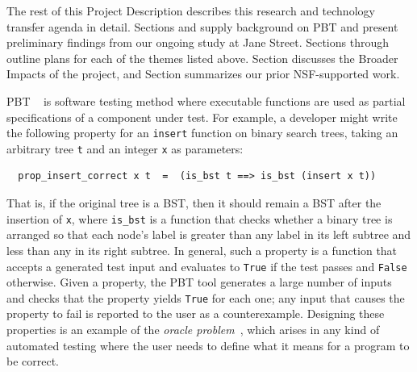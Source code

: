 \medskip

The rest of this Project Description describes this research and
technology transfer agenda in detail.  Sections
 and  supply
background on PBT and present preliminary findings from our
ongoing study at Jane Street.
%
Sections  through
 outline plans for each of the
themes listed above.
Section 
discusses the Broader Impacts of the project, and
Section  summarizes our prior
NSF-supported work.



%
PBT%
~\cite{hughes_quickcheck_2007}
is software testing method where
executable functions are used as partial
specifications of a component under test. For example, a developer might
write the following property for an \lstinline{insert}
function on binary search trees, taking an arbitrary tree \texttt{t}
and an integer
\texttt{x} as parameters:
\begin{lstlisting}
  prop_insert_correct x t  =  (is_bst t ==> is_bst (insert x t))
\end{lstlisting}
That is, if the original tree
is a BST, then it should remain
a BST after the insertion of \texttt{x},
where \lstinline{is_bst} is a function that checks whether a binary
tree is arranged so that each node's label is greater
than any label in its left subtree and less than any in its right
subtree.
In general, such a property is a function that
accepts a generated
test input
and evaluates to \lstinline{True} if the test passes and
\lstinline{False} otherwise.
Given a property, the PBT tool generates a
large number of inputs and
checks that the property yields \lstinline{True} for each one; any input
that causes the property to fail is reported to the user as a
{counterexample}.
%
Designing these properties is an example of
the {\em oracle problem}~\cite{barr_oracle_2015}, which arises in any kind of
automated testing where the user needs to define what it means for a program to
be correct.

